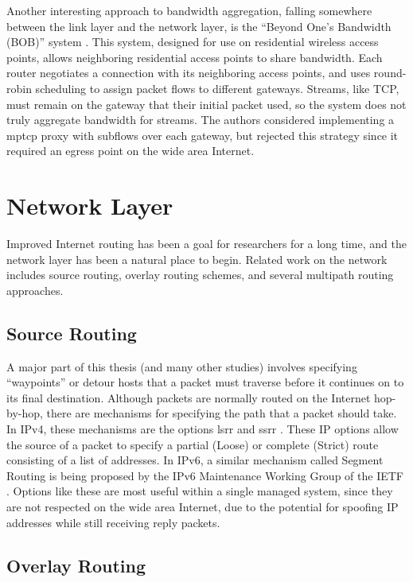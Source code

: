 \documentclass{cwru}
\begin{document}
Another interesting approach to bandwidth aggregation, falling somewhere between
the link layer and the network layer, is the ``Beyond One's Bandwidth (BOB)''
system \cite{radio-agg}. This system, designed for use on residential wireless
access points, allows neighboring residential access points to share bandwidth.
Each router negotiates a connection with its neighboring access points, and uses
round-robin scheduling to assign packet flows to different gateways. Streams,
like TCP, must remain on the gateway that their initial packet used, so the
system does not truly aggregate bandwidth for streams. The authors considered
implementing a \ac{mptcp} proxy with subflows over each gateway, but rejected
this strategy since it required an egress point on the wide area Internet.

\section{Network Layer}

Improved Internet routing has been a goal for researchers for a long time, and
the network layer has been a natural place to begin. Related work on the network
includes source routing, overlay routing schemes, and several multipath routing
approaches.

\subsection{Source Routing}

A major part of this thesis (and many other studies) involves specifying
``waypoints'' or detour hosts that a packet must traverse before it continues on
to its final destination. Although packets are normally routed on the Internet
hop-by-hop, there are mechanisms for specifying the path that a packet should
take. In IPv4, these mechanisms are the options \ac{lsrr} and \ac{ssrr}
\cite{rfc791}. These IP options allow the source of a packet to specify a
partial (Loose) or complete (Strict) route consisting of a list of addresses. In
IPv6, a similar mechanism called Segment Routing is being proposed by the IPv6
Maintenance Working Group of the IETF \cite{draft-segment-routing}. Options like
these are most useful within a single managed system, since they are not
respected on the wide area Internet, due to the potential for spoofing IP
addresses while still receiving reply packets.

\subsection{Overlay Routing}
\end{document}
